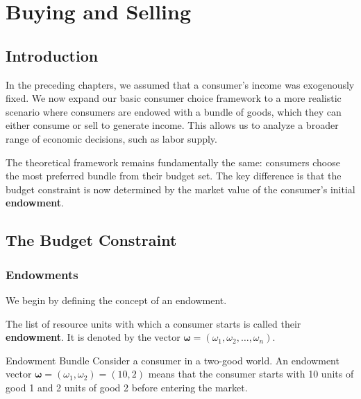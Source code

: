 
\chapter{Buying and Selling}\label{chap:buying_selling}

\section{Introduction}

In the preceding chapters, we assumed that a consumer's income was exogenously fixed. We now expand our basic consumer choice framework to a more realistic scenario where consumers are endowed with a bundle of goods, which they can either consume or sell to generate income. This allows us to analyze a broader range of economic decisions, such as labor supply.

The theoretical framework remains fundamentally the same: consumers choose the most preferred bundle from their budget set. The key difference is that the budget constraint is now determined by the market value of the consumer's initial \textbf{endowment}.

\section{The Budget Constraint}

\subsection{Endowments}

We begin by defining the concept of an endowment.

\begin{definition}[Endowment]
The list of resource units with which a consumer starts is called their \textbf{endowment}. It is denoted by the vector $\boldsymbol{\omega} = (\omega_1, \omega_2, \dots, \omega_n)$.
\end{definition}

\begin{examplebox}{Endowment Bundle}
    Consider a consumer in a two-good world. An endowment vector $\boldsymbol{\omega} = (\omega_1, \omega_2) = (10, 2)$ means that the consumer starts with 10 units of good 1 and 2 units of good 2 before entering the market.
\end{examplebox}

